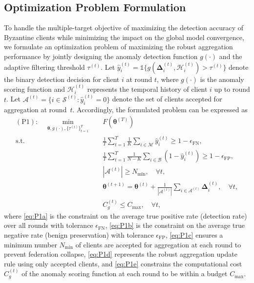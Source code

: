 \subsection{Optimization Problem Formulation}

To handle the multiple-target objective of maximizing the detection accuracy of Byzantine clients while minimizing the impact on the global model convergence, we formulate an optimization problem of maximizing the robust aggregation performance by jointly designing the anomaly detection function $g(\cdot)$ and the adaptive filtering threshold $\tau^{(t)}$. Let $\hat{y}_i^{(t)} = \mathbb{1}\{g(\boldsymbol{\Delta}_i^{(t)}, \mathcal{H}_i^{(t)}) > \tau^{(t)}\}$ denote the binary detection decision for client $i$ at round $t$, where $g(\cdot)$ is the anomaly scoring function and $\mathcal{H}_i^{(t)}$ represents the temporal history of client $i$ up to round $t$. Let $\mathcal{A}^{(t)} = \{i \in \mathcal{S}^{(t)} : \hat{y}_i^{(t)} = 0\}$ denote the set of clients accepted for aggregation at round~$t$. Accordingly, the formulated problem can be expressed as
\begin{subequations}\label{eq:P1}
\begin{align}
    (\text{P1}): \quad \min_{\boldsymbol{\theta}, g(\cdot), \{\tau^{(t)}\}_{t=1}^{T}} \quad & F\left(\boldsymbol{\theta}^{(T)}\right) \label{eq:P1_obj} \\
    \text{s.t.} \quad & \frac{1}{T} \sum_{t=1}^{T} \frac{1}{K} \sum_{i \in \mathcal{M}} \hat{y}_i^{(t)} \geq 1 - \epsilon_{\text{FN}}, \label{eq:P1a} \\
    & \frac{1}{T} \sum_{t=1}^{T} \frac{1}{N-K} \sum_{i \in \mathcal{B}} (1 - \hat{y}_i^{(t)}) \geq 1 - \epsilon_{\text{FP}}, \label{eq:P1b} \\
    & |\mathcal{A}^{(t)}| \geq N_{\min}, \quad \forall t, \label{eq:P1c} \\
    & \boldsymbol{\theta}^{(t+1)} = \boldsymbol{\theta}^{(t)} + \frac{1}{|\mathcal{A}^{(t)}|} \sum_{i \in \mathcal{A}^{(t)}} \boldsymbol{\Delta}_i^{(t)}, \quad \forall t, \label{eq:P1d} \\
    & C_g^{(t)} \leq C_{\max}, \quad \forall t, \label{eq:P1e}
\end{align}
\end{subequations}
where \eqref{eq:P1a} is the constraint on the average true positive rate (detection rate) over all rounds with tolerance $\epsilon_{\text{FN}}$, \eqref{eq:P1b} is the constraint on the average true negative rate (benign preservation) with tolerance $\epsilon_{\text{FP}}$, \eqref{eq:P1c} ensures a minimum number $N_{\min}$ of clients are accepted for aggregation at each round to prevent federation collapse, \eqref{eq:P1d} represents the robust aggregation update rule using only accepted clients, and \eqref{eq:P1e} constrains the computational cost $C_g^{(t)}$ of the anomaly scoring function at each round to be within a budget $C_{\max}$.


